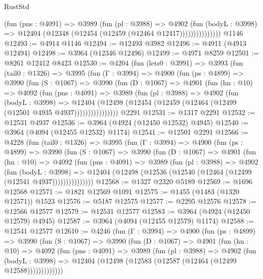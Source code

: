 \begin{lexlean}{RustStd}
\begin{coremodule}
{\begin{coremodule}
{{{{{{{{{{{{{{{{{{{{{{{{{{{{{{{{{{{{{{                    (fun (pns : @4091) =>
                    @3989
                      (fun (pl : @3988) =>
                      @4902
                        (fun (bodyL : @3998) =>
                        @12404 (@12348 (@12454 (@12459 (@12464 @12417)))))))))))))))
    @1146
@12493 := @4914 @1146
@12494 := @12493 @3982
@12496 := @4911 (@4913 @12494)
@12498 := @3964 (@12346 @12496)
@12499 := @4971 @8259
@12501 := @8261 @12412 @8423
@12530 := @4204
    (fun (lets0 : @3991) =>
    @3993
      (fun (tail0 : @1326) =>
      @3995
        (fun (Γ : @3994) =>
        @4900
          (fun (ps : @4899) =>
          @3990
            (fun (S : @1067) =>
            @3990
              (fun (D : @1067) =>
              @4901
                (fun (hn : @10) =>
                @4092
                  (fun (pns : @4091) =>
                  @3989
                    (fun (pl : @3988) =>
                    @4902
                      (fun (bodyL : @3998) =>
                      @12404
                        (@12498 (@12454 (@12459 (@12464 (@12499 (@12501 @4935 @4937))))))))))))))))
    @2291
@12531 := @1317 @2291
@12532 := @12531 @4937
@12536 := @3964 (@4924 (@12450 @12532) @4945)
@12540 := @3964 (@4094 (@12455 @12532) @1174)
@12541 := @12501 @2291
@12566 := @4228
    (fun (tail0 : @1326) =>
    @3995
      (fun (Γ : @3994) =>
      @4900
        (fun (ps : @4899) =>
        @3990
          (fun (S : @1067) =>
          @3990
            (fun (D : @1067) =>
            @4901
              (fun (hn : @10) =>
              @4092
                (fun (pns : @4091) =>
                @3989
                  (fun (pl : @3988) =>
                  @4902
                    (fun (bodyL : @3998) =>
                    @12404 (@12498 (@12536 (@12540 (@12464 (@12499 (@12541 @4937)))))))))))))))
@12568 := @1327 @2320 @5189
@12569 := @1696 @12568
@12571 := @1821 @12569 @1091
@12575 := @1455 (@1483 (@1320 @12571)) @1523
@12576 := @5187 @12575
@12577 := @2295 @12576
@12578 := @12566 @12577
@12579 := @12531 @12577
@12583 := @3964 (@4924 (@12450 @12579) @4945)
@12587 := @3964 (@4094 (@12455 @12579) @1174)
@12588 := @12541 @12577
@12610 := @4246
    (fun (Γ : @3994) =>
    @4900
      (fun (ps : @4899) =>
      @3990
        (fun (S : @1067) =>
        @3990
          (fun (D : @1067) =>
          @4901
            (fun (hn : @10) =>
            @4092
              (fun (pns : @4091) =>
              @3989
                (fun (pl : @3988) =>
                @4902
                  (fun (bodyL : @3998) =>
                  @12404 (@12498 (@12583 (@12587 (@12464 (@12499 @12588)))))))))))))
}}}}}}}}}}}}}}}}}}}}}}}}}}}}}}}}}}}}}}
\end{coremodule}}
\end{coremodule}
\end{lexlean}
